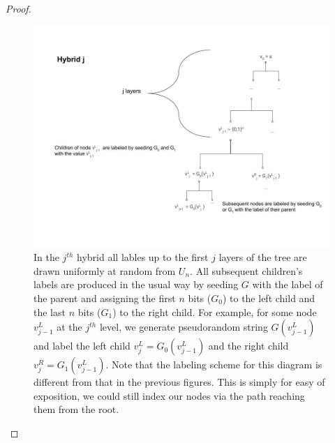 \begin{proof}
\begin{figure}
\centering
\includegraphics[width=\textwidth, height=0.25\paperheight, keepaspectratio]{../figure/hybrid_j_thm_5-1.jpg}
\caption{In the \(j^{th}\) hybrid all lables up to the first \(j\)
layers of the tree are drawn uniformly at random from \(U_{n}\). All
subsequent children's labels are produced in the usual way by seeding
\(G\) with the label of the parent and assigning the first \(n\) bits
(\(G_{0}\)) to the left child and the last \(n\) bits (\(G_{1}\)) to the
right child. For example, for some node \(v^{L}_{j-1}\) at the
\(j^{th}\) level, we generate pseudorandom string \(G(v^{L}_{j-1})\) and
label the left child \(v^{L}_{j} = G_{0}(v^{L}_{j-1})\) and the right
child \(v^{R}_{j} = G_{1}(v^{L}_{j-1})\). Note that the labeling scheme
for this diagram is different from that in the previous figures. This is
simply for easy of exposition, we could still index our nodes via the
path reaching them from the root.}
\label{hybridj}
\end{figure}


\end{proof}
